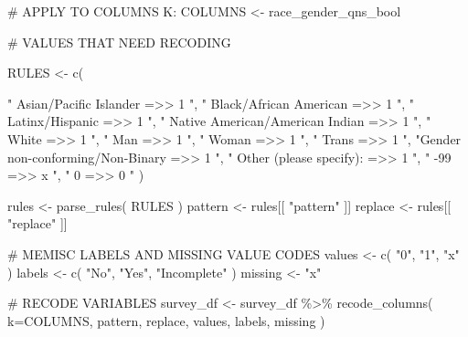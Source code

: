 \documentclass[
  letterpaper,
]{scrbook}
\newenvironment{Shaded}{\begin{snugshade}}{\end{snugshade}}
\newcommand{\AttributeTok}[1]{\textcolor[rgb]{0.40,0.45,0.13}{#1}}
\newcommand{\CommentTok}[1]{\textcolor[rgb]{0.37,0.37,0.37}{#1}}
\newcommand{\FunctionTok}[1]{\textcolor[rgb]{0.28,0.35,0.67}{#1}}
\newcommand{\NormalTok}[1]{\textcolor[rgb]{0.00,0.23,0.31}{#1}}
\newcommand{\OtherTok}[1]{\textcolor[rgb]{0.00,0.23,0.31}{#1}}
\newcommand{\SpecialCharTok}[1]{\textcolor[rgb]{0.37,0.37,0.37}{#1}}
\newcommand{\StringTok}[1]{\textcolor[rgb]{0.13,0.47,0.30}{#1}}
\begin{document}
\begin{Shaded}
\begin{Highlighting}[]
\CommentTok{\# APPLY TO COLUMNS K:}
\NormalTok{COLUMNS }\OtherTok{\textless{}{-}}\NormalTok{  race\_gender\_qns\_bool}

\CommentTok{\# VALUES THAT NEED RECODING}

\NormalTok{RULES }\OtherTok{\textless{}{-}} \FunctionTok{c}\NormalTok{(    }
  
          \StringTok{"          Asian/Pacific Islander    =\textgreater{}\textgreater{}     1   "}\NormalTok{,}
          \StringTok{"          Black/African American    =\textgreater{}\textgreater{}     1   "}\NormalTok{,}
          \StringTok{"                 Latinx/Hispanic    =\textgreater{}\textgreater{}     1   "}\NormalTok{,}
          \StringTok{" Native American/American Indian    =\textgreater{}\textgreater{}     1   "}\NormalTok{,}
          \StringTok{"                           White    =\textgreater{}\textgreater{}     1   "}\NormalTok{,}
          \StringTok{"                             Man    =\textgreater{}\textgreater{}     1   "}\NormalTok{,}
          \StringTok{"                           Woman    =\textgreater{}\textgreater{}     1   "}\NormalTok{,}
          \StringTok{"                           Trans    =\textgreater{}\textgreater{}     1   "}\NormalTok{,}
          \StringTok{"Gender non{-}conforming/Non{-}Binary    =\textgreater{}\textgreater{}     1   "}\NormalTok{,}
          \StringTok{"         Other (please specify):    =\textgreater{}\textgreater{}     1   "}\NormalTok{,}
          \StringTok{"                             {-}99    =\textgreater{}\textgreater{}     x   "}\NormalTok{,}
          \StringTok{"                               0    =\textgreater{}\textgreater{}     0   "}\NormalTok{     )}


\NormalTok{rules }\OtherTok{\textless{}{-}} \FunctionTok{parse\_rules}\NormalTok{( RULES )          }
\NormalTok{pattern }\OtherTok{\textless{}{-}}\NormalTok{ rules[[ }\StringTok{"pattern"}\NormalTok{ ]]}
\NormalTok{replace }\OtherTok{\textless{}{-}}\NormalTok{ rules[[ }\StringTok{"replace"}\NormalTok{ ]]}

\CommentTok{\# MEMISC LABELS AND MISSING VALUE CODES }
\NormalTok{values  }\OtherTok{\textless{}{-}} \FunctionTok{c}\NormalTok{( }\StringTok{"0"}\NormalTok{, }\StringTok{"1"}\NormalTok{, }\StringTok{"x"}\NormalTok{ )}
\NormalTok{labels  }\OtherTok{\textless{}{-}} \FunctionTok{c}\NormalTok{( }\StringTok{"No"}\NormalTok{, }\StringTok{"Yes"}\NormalTok{, }\StringTok{"Incomplete"}\NormalTok{ )}
\NormalTok{missing }\OtherTok{\textless{}{-}} \StringTok{"x"}

\CommentTok{\# RECODE VARIABLES }
\NormalTok{survey\_df }\OtherTok{\textless{}{-}} 
\NormalTok{  survey\_df }\SpecialCharTok{\%\textgreater{}\%} 
  \FunctionTok{recode\_columns}\NormalTok{( }\AttributeTok{k=}\NormalTok{COLUMNS, pattern, replace, values, labels, missing )}
\end{Highlighting}
\end{Shaded}
\end{document}
